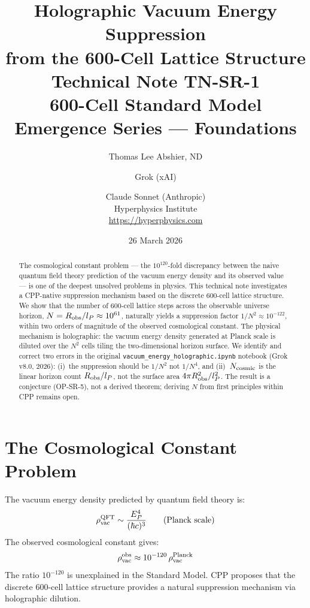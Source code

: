 \documentclass[11pt]{article}
\title{\textbf{Holographic Vacuum Energy Suppression\\
from the 600-Cell Lattice Structure}\\[6pt]
{\large Technical Note TN-SR-1}\\[4pt]
{\normalsize 600-Cell Standard Model Emergence Series — Foundations}}
\author{Thomas Lee Abshier, ND \and Grok (xAI) \and Claude Sonnet (Anthropic)\\[4pt]
Hyperphysics Institute\\
\url{https://hyperphysics.com}}
\date{26 March 2026}
\begin{document}
\maketitle

\begin{abstract}
The cosmological constant problem — the $10^{120}$-fold discrepancy
between the naive quantum field theory prediction of the vacuum energy
density and its observed value — is one of the deepest unsolved problems
in physics.  This technical note investigates a CPP-native suppression
mechanism based on the discrete 600-cell lattice structure.  We show
that the number of 600-cell lattice steps across the observable universe
horizon, $N = R_{\rm obs}/l_P \approx 10^{61}$, naturally yields a
suppression factor $1/N^2 \approx 10^{-122}$, within two orders of
magnitude of the observed cosmological constant.
The physical mechanism is holographic: the vacuum energy density
generated at Planck scale is diluted over the $N^2$ cells tiling
the two-dimensional horizon surface.
We identify and correct two errors in the original
\texttt{vacuum\_energy\_holographic.ipynb} notebook (Grok v8.0, 2026):
(i)~the suppression should be $1/N^2$ not $1/N^4$, and
(ii)~$N_{\rm cosmic}$ is the linear horizon count $R_{\rm obs}/l_P$,
not the surface area $4\pi R_{\rm obs}^2/l_P^2$.
The result is a conjecture (OP-SR-5), not a derived theorem;
deriving $N$ from first principles within CPP remains open.
\end{abstract}

\section{The Cosmological Constant Problem}

The vacuum energy density predicted by quantum field theory is:
\begin{equation}
\rho_{\rm vac}^{\rm QFT} \sim \frac{E_P^4}{(\hbar c)^3}
\qquad (\text{Planck scale})
\end{equation}
The observed cosmological constant gives:
\begin{equation}
\rho_{\rm vac}^{\rm obs} \approx 10^{-120}\,\rho_{\rm vac}^{\rm Planck}
\end{equation}
The ratio $10^{-120}$ is unexplained in the Standard Model.
CPP proposes that the discrete 600-cell lattice structure provides
a natural suppression mechanism via holographic dilution.
\end{document}
